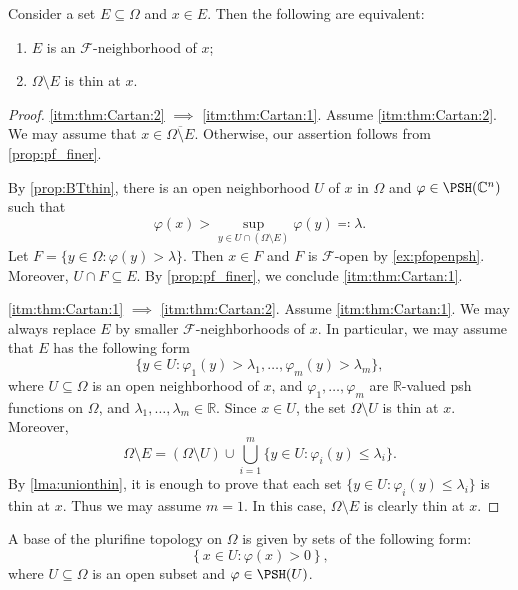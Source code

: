 \begin{theorem}[H.~Cartan]\label{thm:Cartan}
  Consider a set $E\subseteq \Omega$ and $x\in E$.
  Then the following are equivalent:
  \begin{enumerate}
    \item\label{itm:thm:Cartan:1} $E$ is an $\mathcal{F}$-neighborhood of $x$;
    \item\label{itm:thm:Cartan:2} $\Omega\setminus E$ is thin at $x$.
  \end{enumerate}
\end{theorem}
\begin{proof}
  \ref{itm:thm:Cartan:2} $\implies$ \ref{itm:thm:Cartan:1}. Assume \ref{itm:thm:Cartan:2}. We may assume that $x\in \overline{\Omega\setminus E}$. Otherwise, our assertion follows from \cref{prop:pf_finer}.

  By \cref{prop:BTthin}, there is an open neighborhood $U$ of $x$ in $\Omega$ and $\varphi\in \PSH(\mathbb{C}^n)$ such that
  \[
      \varphi(x)>\sup_{y\in U\cap (\Omega\setminus E)} \varphi(y)\eqqcolon \lambda.
  \]
  Let $F=\{y\in \Omega: \varphi(y)>\lambda\}$. Then $x\in F$ and $F$ is $\mathcal{F}$-open by \cref{ex:pfopenpsh}. Moreover, $U\cap F\subseteq E$. By \cref{prop:pf_finer}, we conclude \ref{itm:thm:Cartan:1}.

  \ref{itm:thm:Cartan:1} $\implies$ \ref{itm:thm:Cartan:2}. Assume \ref{itm:thm:Cartan:1}. We may always replace $E$ by smaller $\mathcal{F}$-neighborhoods of $x$. In particular, we may assume that $E$ has the following form
  \[
      \{y\in U:\varphi_1(y)>\lambda_1,\ldots,\varphi_m(y)>\lambda_m\},
  \]
  where $U\subseteq \Omega$ is an open neighborhood of $x$, and $\varphi_1,\ldots,\varphi_m$ are $\mathbb{R}$-valued psh functions on $\Omega$, and $\lambda_1,\ldots,\lambda_m\in \mathbb{R}$. Since $x\in U$, the set $\Omega\setminus U$ is thin at $x$. Moreover,
    \[
        \Omega\setminus E=(\Omega\setminus U)\cup \bigcup_{i=1}^m\{y\in U:\varphi_i(y)\leq\lambda_i\}.
    \]
    By \cref{lma:unionthin}, it is enough to prove that each set $\{y\in U:\varphi_i(y)\leq\lambda_i\}$ is thin at $x$. Thus we may assume $m=1$. In this case, $\Omega\setminus E$ is clearly thin at $x$.
\end{proof}


\begin{theorem}\label{thm:pf_basis}
  A base of the plurifine topology on $\Omega$ is given by sets of the following form:
  \begin{equation}\label{eq:basis_fine}
    \left\{x\in U: \varphi(x)>0\right\},
  \end{equation}
  where $U\subseteq \Omega$ is an open subset and $\varphi\in \PSH(U)$.
\end{theorem}

